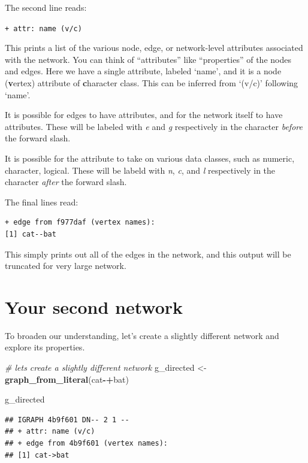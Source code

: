 \documentclass[
]{book}
\newenvironment{Shaded}{\begin{snugshade}}{\end{snugshade}}
\newcommand{\CommentTok}[1]{\textcolor[rgb]{0.56,0.35,0.01}{\textit{#1}}}
\newcommand{\FunctionTok}[1]{\textcolor[rgb]{0.13,0.29,0.53}{\textbf{#1}}}
\newcommand{\NormalTok}[1]{#1}
\newcommand{\OtherTok}[1]{\textcolor[rgb]{0.56,0.35,0.01}{#1}}
\newcommand{\SpecialCharTok}[1]{\textcolor[rgb]{0.81,0.36,0.00}{\textbf{#1}}}
\newcommand{\StringTok}[1]{\textcolor[rgb]{0.31,0.60,0.02}{#1}}
\begin{document}
The second line reads:

\texttt{+\ attr:\ name\ (v/c)}

This prints a list of the various node, edge, or network-level attributes associated with the network. You can think of ``attributes'' like ``properties'' of the nodes and edges. Here we have a single attribute, labeled `name', and it is a node (\textbf{v}ertex) attribute of \textbf{c}haracter class. This can be inferred from `(v/c)' following `name'.

It is possible for edges to have attributes, and for the network itself to have attributes. These will be labeled with \emph{e} and \emph{g} respectively in the character \emph{before} the forward slash.

It is possible for the attribute to take on various data classes, such as numeric, character, logical. These will be labeld with \emph{n}, \emph{c}, and \emph{l} respectively in the character \emph{after} the forward slash.

The final lines read:

\begin{verbatim}
+ edge from f977daf (vertex names):
[1] cat--bat
\end{verbatim}

This simply prints out all of the edges in the network, and this output will be truncated for very large network.

\section{Your second network}\label{your-second-network}

To broaden our understanding, let's create a slightly different network and explore its properties.

\begin{Shaded}
\begin{Highlighting}[]
\CommentTok{\# let\textquotesingle{}s create a slightly different network}
\NormalTok{g\_directed }\OtherTok{\textless{}{-}} \FunctionTok{graph\_from\_literal}\NormalTok{(}\StringTok{\textquotesingle{}cat\textquotesingle{}}\SpecialCharTok{{-}+}\StringTok{\textquotesingle{}bat\textquotesingle{}}\NormalTok{)}

\NormalTok{g\_directed}
\end{Highlighting}
\end{Shaded}

\begin{verbatim}
## IGRAPH 4b9f601 DN-- 2 1 -- 
## + attr: name (v/c)
## + edge from 4b9f601 (vertex names):
## [1] cat->bat
\end{verbatim}
\end{document}

